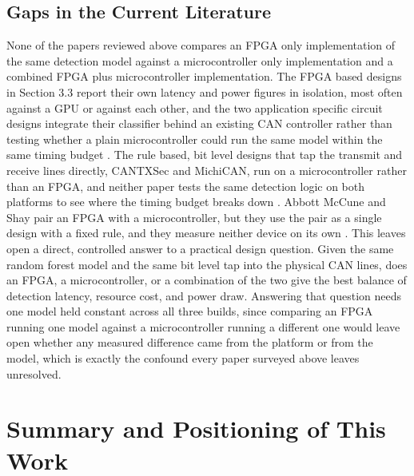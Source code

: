 \documentclass[11pt]{article}
\begin{document}
\subsection{Gaps in the Current Literature}

None of the papers reviewed above compares an FPGA only implementation of the same detection model against a microcontroller only implementation and a combined FPGA plus microcontroller implementation. The FPGA based designs in Section 3.3 report their own latency and power figures in isolation, most often against a GPU or against each other, and the two application specific circuit designs integrate their classifier behind an existing CAN controller rather than testing whether a plain microcontroller could run the same model within the same timing budget \cite{khandelwal2022fpl,lee2025asic,jang2026electronics}. The rule based, bit level designs that tap the transmit and receive lines directly, CANTXSec and MichiCAN, run on a microcontroller rather than an FPGA, and neither paper tests the same detection logic on both platforms to see where the timing budget breaks down \cite{donadel2025,pese2025michican}. Abbott McCune and Shay pair an FPGA with a microcontroller, but they use the pair as a single design with a fixed rule, and they measure neither device on its own \cite{abbottmccune2016}. This leaves open a direct, controlled answer to a practical design question. Given the same random forest model and the same bit level tap into the physical CAN lines, does an FPGA, a microcontroller, or a combination of the two give the best balance of detection latency, resource cost, and power draw. Answering that question needs one model held constant across all three builds, since comparing an FPGA running one model against a microcontroller running a different one would leave open whether any measured difference came from the platform or from the model, which is exactly the confound every paper surveyed above leaves unresolved.

\section{Summary and Positioning of This Work}
\end{document}
